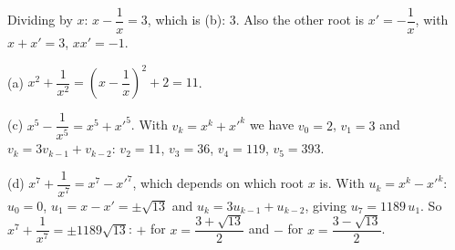 Dividing by $x$: $x-\dfrac1x=3$, which is (b): $\boxed{3}$. Also the other root is $x'=-\dfrac1x$, with $x+x'=3$, $xx'=-1$.

(a) $x^2+\dfrac1{x^2}=\left(x-\dfrac1x\right)^2+2=\boxed{11}$.

(c) $x^5-\dfrac1{x^5}=x^5+x'^5$. With $v_k=x^k+x'^k$ we have $v_0=2$, $v_1=3$ and $v_k=3v_{k-1}+v_{k-2}$: $v_2=11$, $v_3=36$, $v_4=119$, $v_5=\boxed{393}$.

(d) $x^7+\dfrac1{x^7}=x^7-x'^7$, which depends on which root $x$ is. With $u_k=x^k-x'^k$: $u_0=0$, $u_1=x-x'=\pm\sqrt{13}$ and $u_k=3u_{k-1}+u_{k-2}$, giving $u_7=1189\,u_1$. So $x^7+\dfrac1{x^7}=\boxed{\pm1189\sqrt{13}}$: $+$ for $x=\dfrac{3+\sqrt{13}}2$ and $-$ for $x=\dfrac{3-\sqrt{13}}2$.
